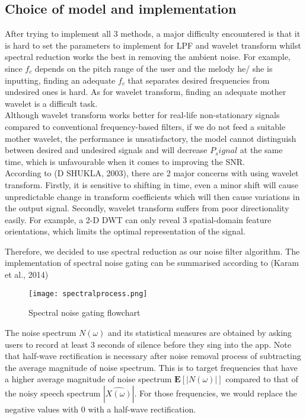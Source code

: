 \subsection{Choice of model and implementation}
After trying to implement all 3 methods, a major difficulty encountered is that it is hard to set the parameters to 
implement for LPF and wavelet transform whilst spectral reduction works the best in removing the ambient noise. 
For example, since $f_c$ depends on the pitch range of the user and the melody he/ she
is inputting, finding an adequate $f_c$ that separates desired frequencies from undesired ones is hard.
As for wavelet transform, finding an adequate mother wavelet is a difficult task.\\
Although wavelet transform works better for real-life non-stationary signals compared to conventional frequency-based filters, if we
do not feed a suitable mother wavelet, the performance is unsatisfactory, the model cannot distinguish between desired and undesired 
signals and will decrease $P_signal$ at the same time, which is unfavourable when it comes to improving the SNR.\\
According to (D SHUKLA, 2003), there are 2 major concerns with using wavelet transform. 
Firstly, it is sensitive to shifting in time, even a minor shift will cause unpredictable change in transform coefficients which will 
then cause variations in the output signal. Secondly, wavelet transform suffers from poor directionality easily. For example, 
a 2-D DWT can only reveal 3 spatial-domain feature orientations, which limits the optimal representation of the signal. 

Therefore, we decided to use spectral reduction as our noise filter algorithm. The implementation of spectral noise gating can be 
summarised according to (Karam et al., 2014)
\begin{figure}
	\centering
	\texttt{[image: spectralprocess.png]}
	\caption{Spectral noise gating flowchart \cite{spectralflowchart}}
	\label{flowchart}
\end{figure}
The noise spectrum $N(\omega)$ and its statistical measures are obtained by asking users to record at least 3 seconds of silence 
before they sing into the app.
Note that half-wave rectification is necessary after noise removal process of subtracting the average magnitude of noise spectrum.
This is to target frequencies that have a higher average magnitude of noise spectrum $\textbf{E}[|N(\omega)|]$ compared to that of 
the noisy speech spectrum $|\hat{X(\omega)}|$. For those frequencies, we would replace the negative values with 0 with a half-wave 
rectification.

